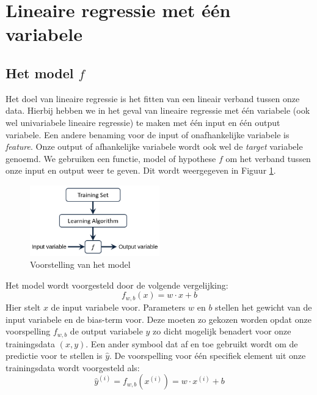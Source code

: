 \section{Lineaire regressie met één variabele}

\subsection{Het model $f$}
Het doel van lineaire regressie is het fitten van een lineair verband tussen onze data. Hierbij hebben we in het geval van lineaire regressie met één variabele (ook wel univariabele lineaire regressie) te maken met één input en één output variabele. Een andere benaming voor de input of onafhankelijke variabele is \textit{feature}. Onze output of afhankelijke variabele wordt ook wel de \textit{target} variabele genoemd. We gebruiken een functie, model of hypothese $f$ om het verband tussen onze input en output weer te geven. Dit wordt weergegeven in Figuur \ref{fig:model-representation}.

\begin{figure}[h]
	\centering
	\includegraphics[width=0.5\textwidth]{images/3-model-representation.png}
	\caption{Voorstelling van het model}
	\label{fig:model-representation}
\end{figure}
\noindent
Het model wordt voorgesteld door de volgende vergelijking:
\begin{equation}
	f_{w,b}(x) = w \cdot x + b
	\label{eq:f-wb}
\end{equation}
Hier stelt $x$ de input variabele voor. Parameters $w$ en $b$ stellen het gewicht van de input variabele en de bias-term voor. Deze moeten zo gekozen worden opdat onze voorspelling $f_{w,b}$ de output variabele $y$ zo dicht mogelijk benadert voor onze trainingsdata $(x,y)$. Een ander symbool dat af en toe gebruikt wordt om de predictie voor te stellen is $\hat{y}$. De voorspelling voor één specifiek element uit onze trainingsdata wordt voorgesteld als:
\begin{equation}
	\hat{y}^{(i)}= f_{w,b}(x^{(i)}) = w \cdot x^{(i)} + b
	\label{eq:f-wb-i}
\end{equation}

